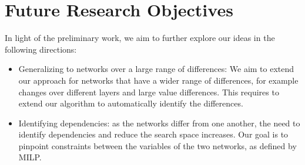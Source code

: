 

\section{Future Research Objectives}
In light of the preliminary work, we aim to further explore our ideas in the following directions:
\begin{itemize}
    \item Generalizing to networks over a large range of differences: We aim to extend our approach for networks that have a wider range of differences, for example changes over different layers and large value differences. This requires to extend our algorithm to automatically identify the differences.
    \item Identifying dependencies: as the networks differ from one another, the need to identify dependencies and reduce the search space increases. Our goal is to pinpoint constraints between the variables of the two networks, as defined by MILP.
\end{itemize}
